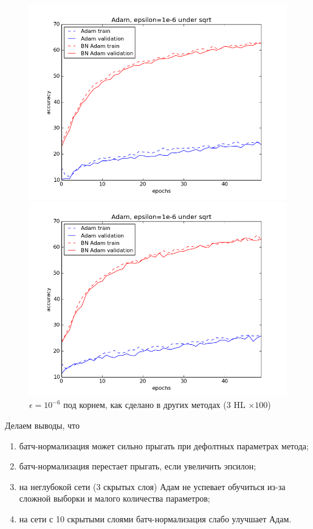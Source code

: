 \documentclass[12pt,oneside]{article}
\begin{document}
\begin{figure}[h!]
\centering
\begin{minipage}{0.45\textwidth}
\includegraphics[scale=0.45]{images/clAdam3.png}
\end{minipage} \hfill
\begin{minipage}{0.45\textwidth}
\includegraphics[scale=0.45]{images/clAdam3_s10.png}
\end{minipage}
\caption{\small $\epsilon = 10^{-6}$ под корнем, как сделано в других методах ($3$ HL $\times 100$)}
\end{figure}

Делаем выводы, что 

\begin{enumerate}
\item батч-нормализация может сильно прыгать при дефолтных параметрах метода;
\item батч-нормализация перестает прыгать, если увеличить эпсилон;
\item на неглубокой сети (3 скрытых слоя) Адам не успевает обучиться из-за сложной выборки и малого количества параметров;
\item на сети с 10 скрытыми слоями батч-нормализация слабо улучшает Адам.
\end{enumerate}
\end{document}
